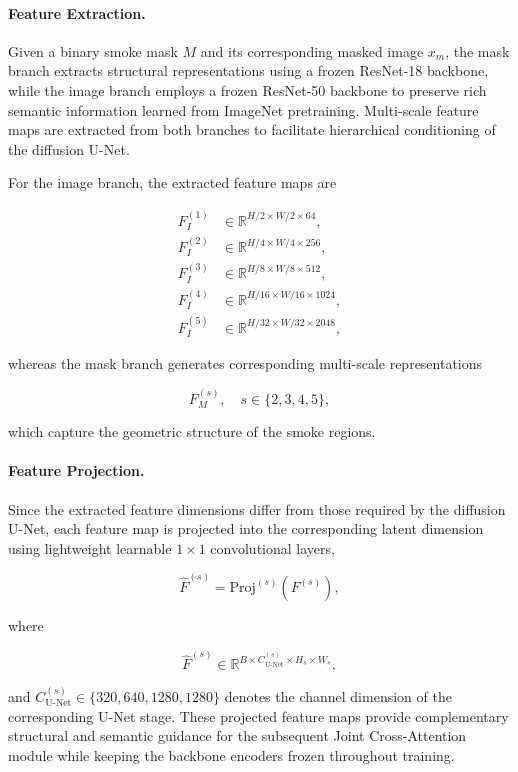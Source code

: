 \documentclass[journal]{IEEEtran}
\begin{document}
\paragraph{Feature Extraction.}
Given a binary smoke mask $M$ and its corresponding masked image $x_m$, the mask branch extracts structural representations using a frozen ResNet-18 backbone, while the image branch employs a frozen ResNet-50 backbone to preserve rich semantic information learned from ImageNet pretraining. Multi-scale feature maps are extracted from both branches to facilitate hierarchical conditioning of the diffusion U-Net.

For the image branch, the extracted feature maps are

\begin{align}
F_I^{(1)} &\in \mathbb{R}^{H/2 \times W/2 \times 64},\\
F_I^{(2)} &\in \mathbb{R}^{H/4 \times W/4 \times 256},\\
F_I^{(3)} &\in \mathbb{R}^{H/8 \times W/8 \times 512},\\
F_I^{(4)} &\in \mathbb{R}^{H/16 \times W/16 \times 1024},\\
F_I^{(5)} &\in \mathbb{R}^{H/32 \times W/32 \times 2048},
\end{align}

whereas the mask branch generates corresponding multi-scale representations

\begin{equation}
F_M^{(s)}, \quad s \in \{2,3,4,5\},
\end{equation}

which capture the geometric structure of the smoke regions.

\paragraph{Feature Projection.}
Since the extracted feature dimensions differ from those required by the diffusion U-Net, each feature map is projected into the corresponding latent dimension using lightweight learnable $1\times1$ convolutional layers,

\begin{equation}
\hat{F}^{(s)}=\mathrm{Proj}^{(s)}\!\left(F^{(s)}\right),
\end{equation}

where

\[
\hat{F}^{(s)}\in
\mathbb{R}^{B\times C_{\mathrm{U\text{-}Net}}^{(s)}\times H_s\times W_s},
\]

and $C_{\mathrm{U\text{-}Net}}^{(s)}\in\{320,640,1280,1280\}$ denotes the channel dimension of the corresponding U-Net stage. These projected feature maps provide complementary structural and semantic guidance for the subsequent Joint Cross-Attention module while keeping the backbone encoders frozen throughout training.
\end{document}
